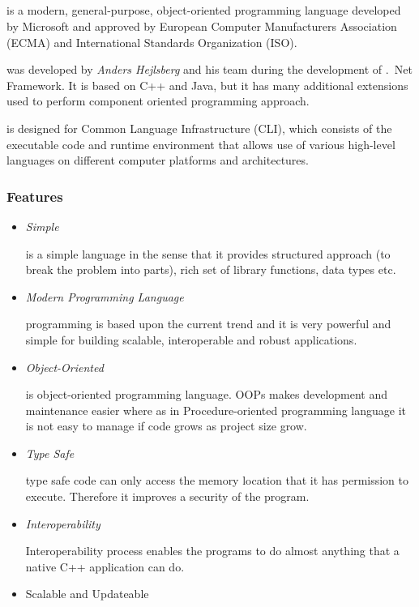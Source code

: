 {\subsection{{\cs}}
 {{\cs}} is a modern, general-purpose, object-oriented programming language developed by Microsoft and approved by European Computer Manufacturers Association (ECMA) and International Standards Organization (ISO).

{\cs} was developed by \textit{Anders Hejlsberg} and his team during the development of .\ Net Framework. It is based on C++ and Java, but it has many additional extensions used to perform component oriented programming approach.

{\cs} is designed for Common Language Infrastructure (CLI), which consists of the executable code and runtime environment that allows use of various high-level languages on different computer platforms and architectures.

\subsubsection*{{\cs} Features}
\begin{itemize}
	\item \textit{Simple}
	
	{\cs} is a simple language in the sense that it provides structured approach (to break the problem into parts), rich set of library functions, data types etc.
	
	\item \textit{Modern Programming Language}

	{\cs} programming is based upon the current trend and it is very powerful and simple for building scalable, interoperable and robust applications.
	\item \textit{Object-Oriented}
	
		{\cs} is object-oriented programming language. OOPs makes development and maintenance easier where as in Procedure-oriented programming language it is not easy to manage if code grows as project size grow.
		
	\item \textit{Type Safe}
	
	{\cs} type safe code can only access the memory location that it has permission to execute. Therefore it improves a security of the program.
	\item \textit{Interoperability}
	
	Interoperability process enables the {\cs} programs to do almost anything that a native C++ application can do.
	\item  Scalable and Updateable
	

\end{itemize}}
